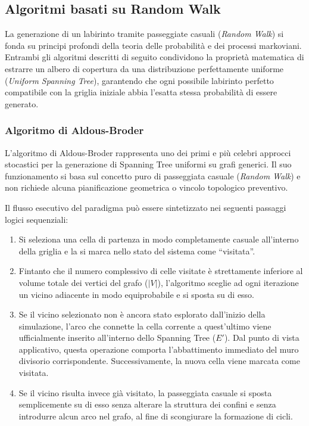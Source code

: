 \documentclass[12pt, a4paper]{article}
\begin{document}
	\subsection{Algoritmi basati su Random Walk}
	La generazione di un labirinto tramite passeggiate casuali (\textit{Random Walk}) si fonda su principi profondi della teoria delle probabilità e dei processi markoviani. Entrambi gli algoritmi descritti di seguito condividono la proprietà matematica di estrarre un albero di copertura da una distribuzione perfettamente uniforme (\textit{Uniform Spanning Tree}), garantendo che ogni possibile labirinto perfetto compatibile con la griglia iniziale abbia l'esatta stessa probabilità di essere generato.
	
	\subsubsection{Algoritmo di Aldous-Broder}
	L'algoritmo di Aldous-Broder rappresenta uno dei primi e più celebri approcci stocastici per la generazione di Spanning Tree uniformi su grafi generici. Il suo funzionamento si basa sul concetto puro di passeggiata casuale (\textit{Random Walk}) e non richiede alcuna pianificazione geometrica o vincolo topologico preventivo.
	
	Il flusso esecutivo del paradigma può essere sintetizzato nei seguenti passaggi logici sequenziali:
	\begin{enumerate}
		\item Si seleziona una cella di partenza in modo completamente casuale all'interno della griglia e la si marca nello stato del sistema come ``visitata''.
		\item Fintanto che il numero complessivo di celle visitate è strettamente inferiore al volume totale dei vertici del grafo ($|V|$), l'algoritmo sceglie ad ogni iterazione un vicino adiacente in modo equiprobabile e si sposta su di esso.
		\item Se il vicino selezionato non è ancora stato esplorato dall'inizio della simulazione, l'arco che connette la cella corrente a quest'ultimo viene ufficialmente inserito all'interno dello Spanning Tree ($E'$). Dal punto di vista applicativo, questa operazione comporta l'abbattimento immediato del muro divisorio corrispondente. Successivamente, la nuova cella viene marcata come visitata.
		\item Se il vicino risulta invece già visitato, la passeggiata casuale si sposta semplicemente su di esso senza alterare la struttura dei confini e senza introdurre alcun arco nel grafo, al fine di scongiurare la formazione di cicli.
	\end{enumerate}
	
\end{document}
